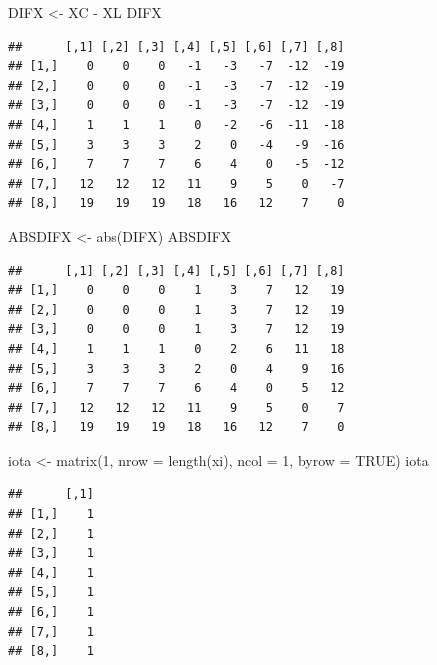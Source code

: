 \documentclass[
]{book}
\newenvironment{Shaded}{\begin{snugshade}}{\end{snugshade}}
\newcommand{\AttributeTok}[1]{\textcolor[rgb]{0.77,0.63,0.00}{#1}}
\newcommand{\ConstantTok}[1]{\textcolor[rgb]{0.00,0.00,0.00}{#1}}
\newcommand{\DecValTok}[1]{\textcolor[rgb]{0.00,0.00,0.81}{#1}}
\newcommand{\FunctionTok}[1]{\textcolor[rgb]{0.00,0.00,0.00}{#1}}
\newcommand{\NormalTok}[1]{#1}
\newcommand{\OtherTok}[1]{\textcolor[rgb]{0.56,0.35,0.01}{#1}}
\newcommand{\SpecialCharTok}[1]{\textcolor[rgb]{0.00,0.00,0.00}{#1}}
\begin{document}
\begin{Shaded}
\begin{Highlighting}[]
\NormalTok{DIFX }\OtherTok{\textless{}{-}}\NormalTok{ XC }\SpecialCharTok{{-}}\NormalTok{ XL}
\NormalTok{DIFX}
\end{Highlighting}
\end{Shaded}

\begin{verbatim}
##      [,1] [,2] [,3] [,4] [,5] [,6] [,7] [,8]
## [1,]    0    0    0   -1   -3   -7  -12  -19
## [2,]    0    0    0   -1   -3   -7  -12  -19
## [3,]    0    0    0   -1   -3   -7  -12  -19
## [4,]    1    1    1    0   -2   -6  -11  -18
## [5,]    3    3    3    2    0   -4   -9  -16
## [6,]    7    7    7    6    4    0   -5  -12
## [7,]   12   12   12   11    9    5    0   -7
## [8,]   19   19   19   18   16   12    7    0
\end{verbatim}

\begin{Shaded}
\begin{Highlighting}[]
\NormalTok{ABSDIFX }\OtherTok{\textless{}{-}} \FunctionTok{abs}\NormalTok{(DIFX)}
\NormalTok{ABSDIFX}
\end{Highlighting}
\end{Shaded}

\begin{verbatim}
##      [,1] [,2] [,3] [,4] [,5] [,6] [,7] [,8]
## [1,]    0    0    0    1    3    7   12   19
## [2,]    0    0    0    1    3    7   12   19
## [3,]    0    0    0    1    3    7   12   19
## [4,]    1    1    1    0    2    6   11   18
## [5,]    3    3    3    2    0    4    9   16
## [6,]    7    7    7    6    4    0    5   12
## [7,]   12   12   12   11    9    5    0    7
## [8,]   19   19   19   18   16   12    7    0
\end{verbatim}

\begin{Shaded}
\begin{Highlighting}[]
\NormalTok{iota }\OtherTok{\textless{}{-}} \FunctionTok{matrix}\NormalTok{(}\DecValTok{1}\NormalTok{, }\AttributeTok{nrow =} \FunctionTok{length}\NormalTok{(xi), }\AttributeTok{ncol =} \DecValTok{1}\NormalTok{, }\AttributeTok{byrow =} \ConstantTok{TRUE}\NormalTok{)}
\NormalTok{iota}
\end{Highlighting}
\end{Shaded}

\begin{verbatim}
##      [,1]
## [1,]    1
## [2,]    1
## [3,]    1
## [4,]    1
## [5,]    1
## [6,]    1
## [7,]    1
## [8,]    1
\end{verbatim}
\end{document}
